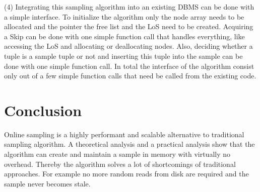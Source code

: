 \documentclass[sigconf,nonacm]{acmart}
\begin{document}
        (4) Integrating this sampling algorithm into an existing DBMS can be done with a simple interface. To initialize the algorithm only the node array needs to be allocated and the pointer the free list and the LoS need to be created. Acquiring a Skip can be done with one simple function call that handles everything, like accessing the LoS and allocating or deallocating nodes. Also, deciding whether a tuple is a sample tuple or not and inserting this tuple into the sample can be done with one simple function call. In total the interface of the algorithm consist only out of a few simple function calls that need be called from the existing code.

    \section{Conclusion}
        Online sampling is a highly performant and scalable alternative to traditional sampling algorithm. A theoretical analysis and a practical analysis show that the algorithm can create and maintain a sample in memory with virtually no overhead. Thereby the algorithm solves a lot of shortcomings of traditional approaches. For example no more random reads from disk are required and the sample never becomes stale.

    
    
\end{document}
